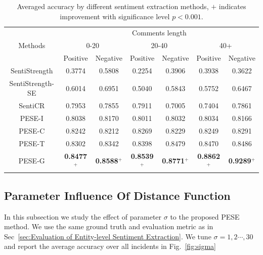\documentclass[runningheads]{llncs}
\begin{document}
\vspace{-0.6cm}
\begin{table}
\caption{Averaged accuracy by different sentiment extraction methods, $+$ indicates improvement with significance level $p<0.001$.}\label{table:sentiment classification}
\begin{center}
\begin{tabular}{|c|c|c|c|c|c|c|}
\hline
\multirow{3}{*}{Methods}             & \multicolumn{6}{c|}{Comments length}                                                \\ \cline{2-7} 
                                     & \multicolumn{2}{c|}{0-20} & \multicolumn{2}{c|}{20-40} & \multicolumn{2}{c|}{40+} \\ \cline{2-7} 
                                     & Positive    & Negative    & Positive     & Negative    & Positive     & Negative    \\ \hline
SentiStrength                        & 0.3774      & 0.5808      & 0.2254       & 0.3906      & 0.3938       & 0.3622      \\ \hline
SentiStrength-SE                     & 0.6014      & 0.6951      & 0.5040       & 0.5843      & 0.5752       & 0.6467      \\ \hline
SentiCR                              & 0.7953      & 0.7855      & 0.7911       & 0.7005      & 0.7404       & 0.7861      \\ \hline
 PESE-I                      & 0.8038      & 0.8170      & 0.8011       & 0.8032      & 0.8034       & 0.8166      \\ \hline
PESE-C                      & 0.8242      & 0.8212      & 0.8269       & 0.8229      & 0.8249       & 0.8291     \\ \hline
PESE-T                    & 0.8302      & 0.8342      & 0.8398      & 0.8479      & 0.8470       & 0.8486      \\ \hline
PESE-G                      & \textbf{0.8477$^+$}      & \textbf{0.8588$^+$}      & \textbf{0.8539$^+$}       & \textbf{0.8771$^+$}      & \textbf{0.8862$^+$}       & \textbf{0.9289$^+$}      \\ \hline
\end{tabular}
\end{center}
\end{table}



\vspace{-1.5cm}
\subsection{Parameter Influence Of Distance Function}
In this subsection we study the effect of parameter $\sigma$ to the proposed PESE method. We use the same ground truth and evaluation metric as in Sec~\ref{sec:Evaluation of Entity-level Sentiment Extraction}. We tune $\sigma=1,2\cdots,30$ and report the average accuracy over all incidents in Fig.~\ref{fig:sigma}
\end{document}
